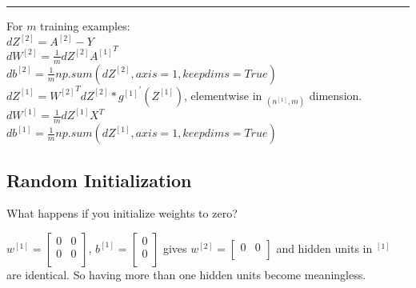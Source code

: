 \documentclass{article}
\begin{document}
\noindent\rule{8cm}{0.4pt}

For $m$ training examples: \\

$dZ^{[2]} = A^{[2]} - Y$\\

$dW^{[2]} = \frac{1}{m}dZ^{[2]}{A^{[1]}}^T$\\

$db^{[2]} = \frac{1}{m}np.sum(dZ^{[2]}, axis=1, keepdims=True)$\\

$dZ^{[1]} = {W^{[2]}}^T dZ^{[2]} * {{g^{[1]}}}^{'}(Z^{[1]})$, elementwise in $_{(n^{[1]},m)}$ dimension.\\

$dW^{[1]} = \frac{1}{m} dZ^{[1]} X^T$\\

$db^{[1]} = \frac{1}{m}np.sum(dZ^{[1]}, axis=1, keepdims=True)$\\


\newpage
\subsection{Random Initialization}

What happens if you initialize weights to zero?\\



$w^{[1]} = \begin{bmatrix}
   0 & 0 \\ 
   0 & 0 \\ 
\end{bmatrix}$, 
$b^{[1]} = \begin{bmatrix}
   0 \\ 
   0 \\ 
\end{bmatrix}$ gives $w^{[2]} = \begin{bmatrix}
   0 & 0\\ 
\end{bmatrix}$ and hidden units in $^{[1]}$ are identical. So having more than one hidden units become meaningless.\\
\end{document}
